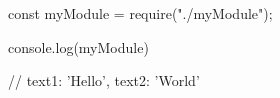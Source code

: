const myModule = require("./myModule");

console.log(myModule)

// { text1: 'Hello', text2: 'World' }